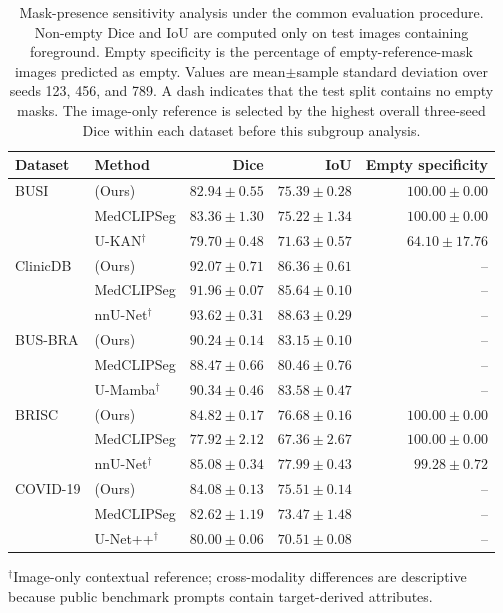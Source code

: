 \begin{table}[htbp]
\centering
\caption{Mask-presence sensitivity analysis under the common evaluation procedure. Non-empty Dice and IoU are computed only on test images containing foreground. Empty specificity is the percentage of empty-reference-mask images predicted as empty. Values are mean$\pm$sample standard deviation over seeds 123, 456, and 789. A dash indicates that the test split contains no empty masks. The image-only reference is selected by the highest overall three-seed Dice within each dataset before this subgroup analysis.}
\label{tab:supp_mask_presence}
\scriptsize
\setlength{\tabcolsep}{3.0pt}
\begin{tabular}{@{}llrrr@{}}
\toprule
Dataset & Method & Dice & IoU & Empty specificity \\
\midrule
BUSI & \methodname{} (Ours) & $82.94\pm0.55$ & $75.39\pm0.28$ & $100.00\pm0.00$ \\
 & MedCLIPSeg & $83.36\pm1.30$ & $75.22\pm1.34$ & $100.00\pm0.00$ \\
 & U-KAN$^\dagger$ & $79.70\pm0.48$ & $71.63\pm0.57$ & $64.10\pm17.76$ \\
\addlinespace
ClinicDB & \methodname{} (Ours) & $92.07\pm0.71$ & $86.36\pm0.61$ & -- \\
 & MedCLIPSeg & $91.96\pm0.07$ & $85.64\pm0.10$ & -- \\
 & nnU-Net$^\dagger$ & $93.62\pm0.31$ & $88.63\pm0.29$ & -- \\
\addlinespace
BUS-BRA & \methodname{} (Ours) & $90.24\pm0.14$ & $83.15\pm0.10$ & -- \\
 & MedCLIPSeg & $88.47\pm0.66$ & $80.46\pm0.76$ & -- \\
 & U-Mamba$^\dagger$ & $90.34\pm0.46$ & $83.58\pm0.47$ & -- \\
\addlinespace
BRISC & \methodname{} (Ours) & $84.82\pm0.17$ & $76.68\pm0.16$ & $100.00\pm0.00$ \\
 & MedCLIPSeg & $77.92\pm2.12$ & $67.36\pm2.67$ & $100.00\pm0.00$ \\
 & nnU-Net$^\dagger$ & $85.08\pm0.34$ & $77.99\pm0.43$ & $99.28\pm0.72$ \\
\addlinespace
COVID-19 & \methodname{} (Ours) & $84.08\pm0.13$ & $75.51\pm0.14$ & -- \\
 & MedCLIPSeg & $82.62\pm1.19$ & $73.47\pm1.48$ & -- \\
 & U-Net++$^\dagger$ & $80.00\pm0.06$ & $70.51\pm0.08$ & -- \\
\bottomrule
\end{tabular}
\begin{flushleft}\footnotesize $^\dagger$Image-only contextual reference; cross-modality differences are descriptive because public benchmark prompts contain target-derived attributes.\end{flushleft}
\end{table}
